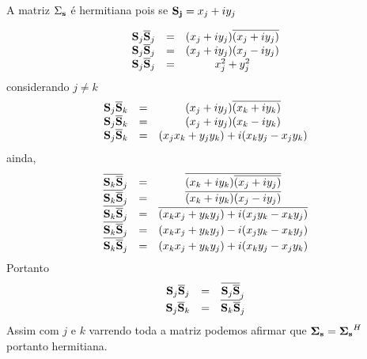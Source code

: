 \documentclass[12pt,a4paper]{article}
\begin{document}
A matriz {\bf $\Sigma_{{\bf s}}$} é hermitiana pois se ${\bf S_j }= x_j+iy_j $

\begin{equation}\label{sec1eqn3}
\begin{array}{ccc}
	{\bf S}_j\overline{{\bf S}}_j&=& (x_j+iy_j)\overline{(x_j+iy_j)} \\
	{\bf S}_j\overline{{\bf S}}_j&=& (x_j+iy_j)(x_j-iy_j) \\
	{\bf S}_j\overline{{\bf S}}_j&=& x_j^2+y_j^2 \\
\end{array}
\end{equation}
considerando $j \neq k$
\begin{equation}\label{sec1eqn4}
\begin{array}{ccc}
	{\bf S}_j\overline{{\bf S}}_k&=& (x_j+iy_j)\overline{(x_k+iy_k)} \\
	{\bf S}_j\overline{{\bf S}}_k&=& (x_j+iy_j)(x_k-iy_k) \\
	{\bf S}_j\overline{{\bf S}}_k&=& (x_jx_k+y_jy_k)+i(x_ky_j-x_jy_k) \\
\end{array}
\end{equation}
ainda,
\begin{equation}\label{sec1eqn5}
\begin{array}{ccc}
	\overline{{\bf S}_k\overline{{\bf S}}}_j&=&\overline{ (x_k+iy_k)\overline{(x_j+iy_j)} }\\
	\overline{{\bf S}_k\overline{{\bf S}}}_j&=&\overline{ (x_k+iy_k)(x_j-iy_j)} \\
	\overline{{\bf S}_k\overline{{\bf S}}}_j&=&\overline{ (x_kx_j+y_ky_j)+i(x_jy_k-x_ky_j) }\\
	\overline{{\bf S}_k\overline{{\bf S}}}_j&=&(x_kx_j+y_ky_j)-i(x_jy_k-x_ky_j) \\
	\overline{{\bf S}_k\overline{{\bf S}}}_j&=&(x_kx_j+y_ky_j)+i(x_ky_j-x_jy_k) \\
\end{array}
\end{equation}
Portanto
\begin{equation}\label{sec1eqn6}
\begin{array}{ccc}
	{\bf S}_j\overline{{\bf S}}_j&=&\overline{{\bf S}_j\overline{{\bf S}}}_j \\
	{\bf S}_j\overline{{\bf S}}_k&=&\overline{{\bf S}_k\overline{{\bf S}}}_j \\
\end{array}
\end{equation}
Assim com $j$ e $k$ varrendo toda a matriz podemos afirmar que ${\bf \Sigma_{{\bf s}}}={\bf \Sigma_{{\bf s}}}^H$ portanto hermitiana.
\end{document}
